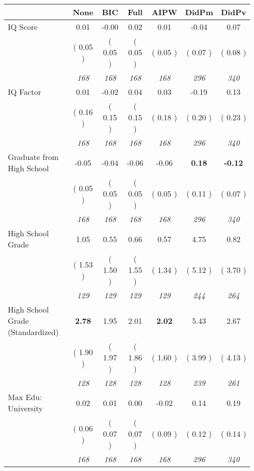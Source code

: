 \begin{tabular}{l c c c c c c}
\toprule
 & None & BIC & Full & AIPW & DidPm & DidPv \\
\midrule
IQ Score &      0.01 &     -0.00 &      0.02 &      0.01 &     -0.04 &      0.07 \\
& (     0.05 ) & (     0.05 ) & (     0.05 ) & (     0.05 ) & (     0.07 ) & (     0.08 ) \\
& \textit{ 168 } & \textit{ 168 } & \textit{ 168 } & \textit{ 168 } & \textit{ 296 } & \textit{ 340 } \\
IQ Factor &      0.01 &     -0.02 &      0.04 &      0.03 &     -0.19 &      0.13 \\
& (     0.16 ) & (     0.15 ) & (     0.15 ) & (     0.18 ) & (     0.20 ) & (     0.23 ) \\
& \textit{ 168 } & \textit{ 168 } & \textit{ 168 } & \textit{ 168 } & \textit{ 296 } & \textit{ 340 } \\
Graduate from High School &     -0.05 &     -0.04 &     -0.06 &     -0.06 & \textbf{      0.18 } & \textbf{     -0.12 } \\
& (     0.05 ) & (     0.05 ) & (     0.05 ) & (     0.05 ) & (     0.11 ) & (     0.07 ) \\
& \textit{ 168 } & \textit{ 168 } & \textit{ 168 } & \textit{ 168 } & \textit{ 296 } & \textit{ 340 } \\
High School Grade &      1.05 &      0.55 &      0.66 &      0.57 &      4.75 &      0.82 \\
& (     1.53 ) & (     1.50 ) & (     1.55 ) & (     1.34 ) & (     5.12 ) & (     3.70 ) \\
& \textit{ 129 } & \textit{ 129 } & \textit{ 129 } & \textit{ 129 } & \textit{ 244 } & \textit{ 264 } \\
High School Grade (Standardized) & \textbf{      2.78 } &      1.95 &      2.01 & \textbf{     2.02} &      5.43 &      2.67 \\
& (     1.90 ) & (     1.97 ) & (     1.86 ) & (     1.60 ) & (     3.99 ) & (     4.13 ) \\
& \textit{ 128 } & \textit{ 128 } & \textit{ 128 } & \textit{ 128 } & \textit{ 239 } & \textit{ 261 } \\
Max Edu: University &      0.02 &      0.01 &      0.00 &     -0.02 &      0.14 &      0.19 \\
& (     0.06 ) & (     0.07 ) & (     0.07 ) & (     0.09 ) & (     0.12 ) & (     0.14 ) \\
& \textit{ 168 } & \textit{ 168 } & \textit{ 168 } & \textit{ 168 } & \textit{ 296 } & \textit{ 340 } \\

\end{tabular}
